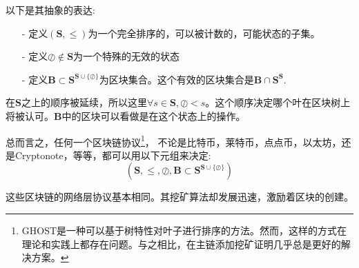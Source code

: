 \documentclass[letterpaper]{article}
\begin{document}
以下是其抽象的表达:

\begin{itemize}
\item[-] %
定义$(\mathbf{S},\leq)$为一个完全排序的，可以被计数的，可能状态的子集。
\item[-]%
定义$\oslash \notin \mathbf{S}$为一个特殊的无效的状态
\item[-]%
定义$\mathbf{B} \subset \mathbf{S}^{\mathbf{S} \cup \{\oslash\}}$为区块集合。这个有效的区块集合是$\mathbf{B} \cap \mathbf{S}^{\mathbf{S}}$.
\end{itemize}

在$\mathbf{S}$之上的顺序被延续，所以这里$\forall s \in \mathbf{S}, \oslash < s$。这个顺序决定哪个叶在区块树上将被认可。$\mathbf{B}$中的区块可以看做是在这个状态上的操作。

总而言之，任何一个区块链协议\footnote{GHOST是一种可以基于树特性对叶子进行排序的方法。然而，这样的方式在理论和实践上都存在问题。与之相比，在主链添加挖矿证明几乎总是更好的解决方案。}，
不论是比特币，莱特币，点点币，以太坊，还是Cryptonote，等等，都可以用以下元组来决定:
$$\left(\mathbf{S},\leq,\oslash,
\mathbf{B} \subset \mathbf{S}^{\mathbf{S} \cup \{\oslash\}}\right)$$

这些区块链的网络层协议基本相同。其挖矿算法却发展迅速，激励着区块的创建。
\end{document}
